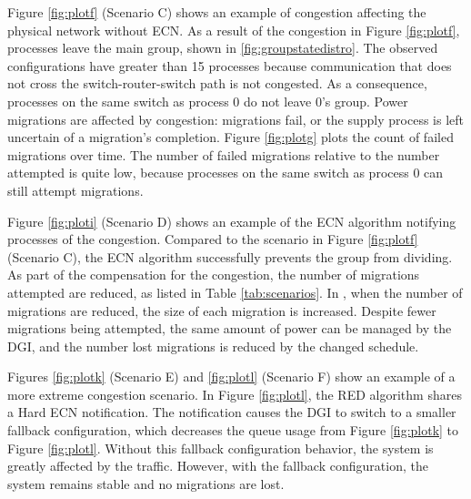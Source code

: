 Figure \ref{fig:plotf} (Scenario C) shows an example of congestion affecting the physical network without \ac{ECN}.
As a result of the congestion in Figure \ref{fig:plotf}, processes leave the main group, shown in \ref{fig:groupstatedistro}.
The observed configurations have greater than 15 processes because communication that does not cross the switch-router-switch path is not congested.
As a consequence, processes on the same switch as process 0 do not leave 0's group.
Power migrations are affected by congestion: migrations fail, or the supply process is left uncertain of a migration's completion.
Figure \ref{fig:plotg} plots the count of failed migrations over time.
The number of failed migrations relative to the number attempted is quite low, because processes on the same switch as process 0 can still attempt migrations.


Figure \ref{fig:ploti} (Scenario D) shows an example of the \ac{ECN} algorithm notifying processes of the congestion.
Compared to the scenario in Figure \ref{fig:plotf} (Scenario C), the \ac{ECN} algorithm successfully prevents the group from dividing.
As part of the compensation for the congestion, the number of migrations attempted are reduced, as listed in Table \ref{tab:scenarios}.
In \cite{ecn-cloudhari}, when the number of migrations are reduced, the size of each migration is increased.
Despite fewer migrations being attempted, the same amount of power can be managed by the \ac{DGI}, and the number lost migrations is reduced by the changed schedule.

Figures \ref{fig:plotk} (Scenario E) and \ref{fig:plotl} (Scenario F) show an example of a more extreme congestion scenario.
In Figure \ref{fig:plotl}, the \ac{RED} algorithm shares a Hard \ac{ECN} notification.
The notification causes the \ac{DGI} to switch to a smaller fallback configuration, which decreases the queue usage from Figure \ref{fig:plotk} to Figure \ref{fig:plotl}.
Without this fallback configuration behavior, the system is greatly affected by the traffic.
However, with the fallback configuration, the system remains stable and no migrations are lost.

